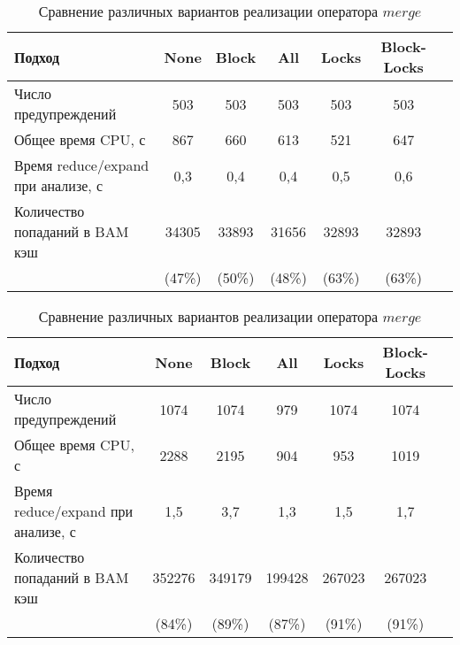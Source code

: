 \begin{center}
  \begin{table}[h]\footnotesize \centering
  	\label{table-drivers-lock-merge}
    \caption{Сравнение различных вариантов реализации оператора $merge$}
    \begin{tabular}{ | l | c | c | c | c | c | c | }
      \hline
      Подход         						& None 			& Block 	& All		& Locks 	& Block-Locks	\\ \hline
      Число предупреждений 					& 503   		& 503       & 503   	& 503   	& 503       	\\ 
      Общее время CPU, с 					& 867 			& 660 		& 613   	& 521 		& 647 	 		\\ 
\hspace{0.5cm} Время reduce/expand при анализе, с & 0,3		& 0,4 		& 0,4   	& 0,5 		& 0,6 	  		\\ \hline
      Количество попаданий в BAM кэш		& 34305  		& 33893   	& 31656   	& 32893  	& 32893  	\\ 
      										& (47\%)		& (50\%)  	& (48\%)	& (63\%)	& (63\%)	\\
      \hline
    \end{tabular}
  \end{table}
\end{center}

\begin{center}
  \begin{table}[h]\footnotesize \centering
  	\label{table-drivers-lock-merge}
    \caption{Сравнение различных вариантов реализации оператора $merge$}
    \begin{tabular}{ | l | c | c | c | c | c | c | }
      \hline
      Подход         						& None 		& Block 	& All 		& Locks 	& Block-Locks 	\\ \hline %
      Число предупреждений 					& 1074  	& 1074      & 979   	& 1074   	& 1074  		\\ %
      Общее время CPU, с 					& 2288 		& 2195 		& 904   	& 953 		& 1019 			\\ %
\hspace{0.5cm} Время reduce/expand
 							при анализе, с	& 1,5 		& 3,7 		& 1,3   	& 1,5 		& 1,7 	 		\\ \hline %
      Количество попаданий в BAM кэш		& 352276  	& 349179  	& 199428   	& 267023  	& 267023  		\\ %
      										& (84\%)	& (89\%)	& (87\%)	& (91\%) 	& (91\%) 		\\ %
      \hline
    \end{tabular}
  \end{table}
\end{center}

